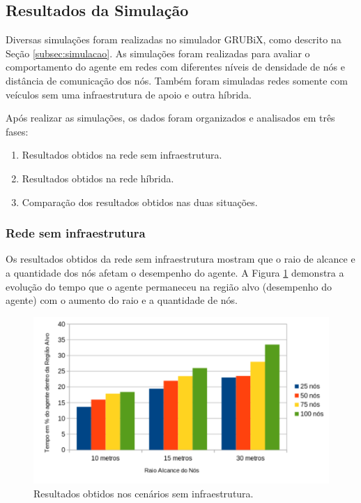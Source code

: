 \subsection{Resultados da Simulação}
\label{subsec:resultadoSimulacao}

	Diversas simulações foram realizadas no simulador GRUBiX, como descrito na Seção \ref{subsec:simulacao}. As simulações foram realizadas para avaliar o comportamento do agente em redes com diferentes níveis de densidade de nós e distância de comunicação dos nós. Também foram simuladas redes somente com veículos sem uma infraestrutura de apoio e outra híbrida.

	Após realizar as simulações, os dados foram organizados e analisados em três fases:

	\begin{enumerate}
		\item Resultados obtidos na rede sem infraestrutura.
		\item Resultados obtidos na rede híbrida.
		\item Comparação dos resultados obtidos nas duas situações.
	\end{enumerate} 

	\subsubsection{Rede sem infraestrutura}
	\label{subsubsection:redeSemInfraestruturaResultadoDiscucao}

	Os resultados obtidos da rede sem infraestrutura mostram que o raio de alcance e a quantidade dos nós afetam o desempenho do agente. A Figura \ref{fig:graficosSemTorres} demonstra a evolução do tempo que o agente permaneceu na região alvo (desempenho do agente) com o aumento do raio e a quantidade de nós. 

	\begin{figure}[htbp]
		\centering
		\includegraphics[scale=0.5]{resultados/graficos/graficoSemTorres.pdf}
		\caption{Resultados obtidos nos cenários sem infraestrutura.}
		\label{fig:graficosSemTorres}
	\end{figure}

